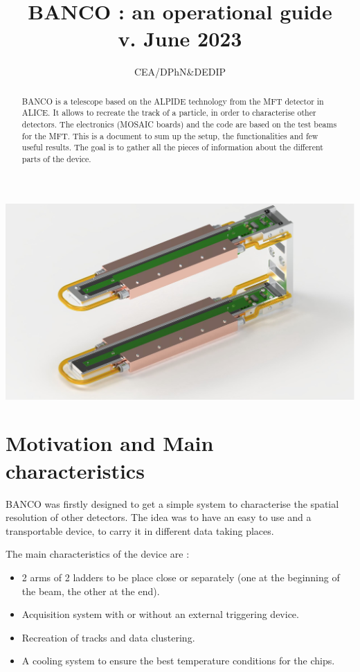 \documentclass[12pt,oneside,a4]{article}
\title{BANCO : an operational guide\\ \small{v. June 2023}}
\author{CEA/DPhN&DEDIP}
\begin{document}
\maketitle
\begin{center}
\includegraphics[width=1\linewidth]{figures/BANCO.png}
\end{center}
\begin{abstract}
BANCO is a telescope based on the ALPIDE technology from the MFT detector in ALICE. It allows to recreate the track of a particle, in order to characterise other detectors. The electronics (MOSAIC boards) and the code are based on the test beams for the MFT. This is a document to sum up the setup, the functionalities and few useful results. The goal is to gather all the pieces of information about the different parts of the device. 
\end{abstract}

\clearpage
\tableofcontents

\clearpage
\section{Motivation and Main characteristics}
BANCO was firstly designed to get a simple system to characterise the spatial resolution of other detectors. The idea was to have an easy to use and a transportable device, to carry it in different data taking places.

\bigskip

The main characteristics  of the device are :
\begin{itemize}
    \item 2 arms of 2 ladders to be place close or separately (one at the beginning of the beam, the other at the end).
    \item Acquisition system with or without an external triggering device.
    \item Recreation of tracks and data clustering.
    \item A cooling system to ensure the best temperature conditions for the chips.
\end{itemize}
\end{document}
